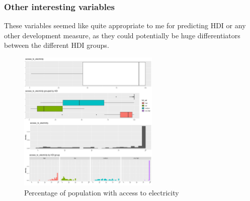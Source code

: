 \documentclass[]{article}
\begin{document}
\hypertarget{other-interesting-variables}{%
\subsubsection{Other interesting
variables}\label{other-interesting-variables}}

These variables seemed like quite appropriate to me for predicting HDI
or any other development measure, as they could potentially be huge
differentiators between the different HDI groups.

\begin{figure}
\centering
\includegraphics[width=0.6\textwidth,height=\textheight]{./img/access_to_electricity.png}
\caption{Percentage of population with access to electricity}
\end{figure}
\end{document}
